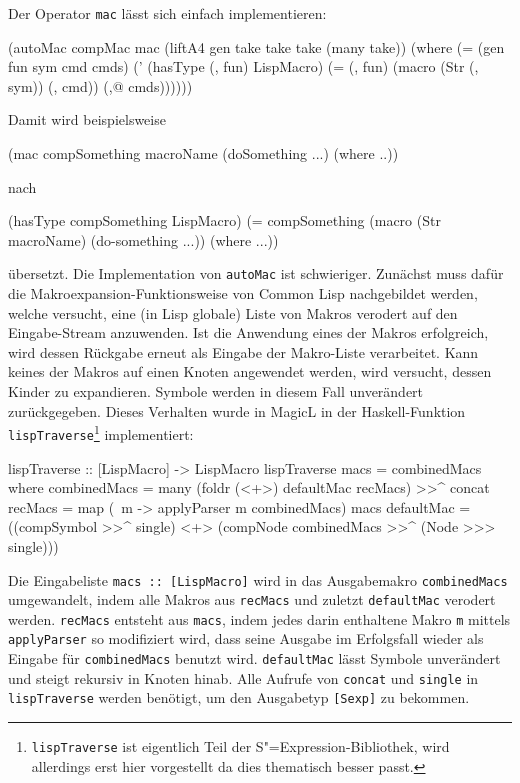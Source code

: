 \documentclass[12pt, a4paper, bibgerm]{scrbook}
\newenvironment{DIFnomarkup}{}{}
\newcommand\icode[1]{\lstinline?#1?}
\newcommand{\sexp}{S"=Expression}
\begin{document}
Der Operator \icode{mac} lässt sich einfach implementieren:
\begin{DIFnomarkup}\begin{code}
(autoMac compMac mac
  (liftA4 gen take take take (many take))
  (where (= (gen fun sym cmd cmds)
            (' (hasType (, fun) LispMacro)
               (= (, fun) (macro (Str (, sym)) (, cmd)) (,@ cmds))))))  
\end{code}\end{DIFnomarkup}
Damit wird beispielsweise 
\begin{DIFnomarkup}\begin{code}
(mac compSomething macroName 
    (doSomething ...) 
  (where ..))
\end{code}\end{DIFnomarkup}
nach
\begin{DIFnomarkup}\begin{code}
(hasType compSomething LispMacro)
(= compSomething (macro (Str macroName)
                   (do-something ...))
  (where ...))
\end{code}\end{DIFnomarkup}
übersetzt. Die Implementation von \icode{autoMac} ist
schwieriger. Zunächst muss dafür die Makroexpansion-Funktionsweise von
Common Lisp nachgebildet werden, welche versucht, eine (in Lisp globale)
Liste von Makros verodert auf den Eingabe-Stream anzuwenden. Ist die
Anwendung eines der Makros erfolgreich, wird dessen Rückgabe erneut als
Eingabe der Makro-Liste verarbeitet. Kann keines der Makros auf einen
Knoten angewendet werden, wird versucht, dessen Kinder zu
expandieren. Symbole werden in diesem Fall unverändert
zurückgegeben. Dieses Verhalten wurde in MagicL in der Haskell-Funktion
\icode{lispTraverse}\footnote{\icode{lispTraverse} ist eigentlich Teil
  der \sexp{}-Bibliothek, wird allerdings erst hier vorgestellt da dies
  thematisch besser passt.} implementiert:
\begin{DIFnomarkup}\begin{code}
lispTraverse :: [LispMacro] -> LispMacro
lispTraverse macs = combinedMacs
  where combinedMacs = many (foldr (<+>) defaultMac recMacs) >>^ concat
        recMacs      = map (\ m -> applyParser m combinedMacs) macs
        defaultMac   = ((compSymbol >>^ single) <+> 
                        (compNode combinedMacs >>^ (Node >>> single)))  
\end{code}\end{DIFnomarkup}
Die Eingabeliste \icode{macs :: [LispMacro]} wird in das Ausgabemakro
\icode{combinedMacs} umgewandelt, indem alle Makros aus \icode{recMacs}
und zuletzt \icode{defaultMac} verodert werden. \icode{recMacs} entsteht
aus \icode{macs}, indem jedes darin enthaltene Makro \icode{m} mittels
\icode{applyParser} so modifiziert wird, dass seine Ausgabe im
Erfolgsfall wieder als Eingabe für \icode{combinedMacs} benutzt
wird. \icode{defaultMac} lässt Symbole unverändert und steigt rekursiv
in Knoten hinab. Alle Aufrufe von \icode{concat} und \icode{single} in
\icode{lispTraverse} werden benötigt, um den Ausgabetyp \icode{[Sexp]}
zu bekommen.
\end{document}
